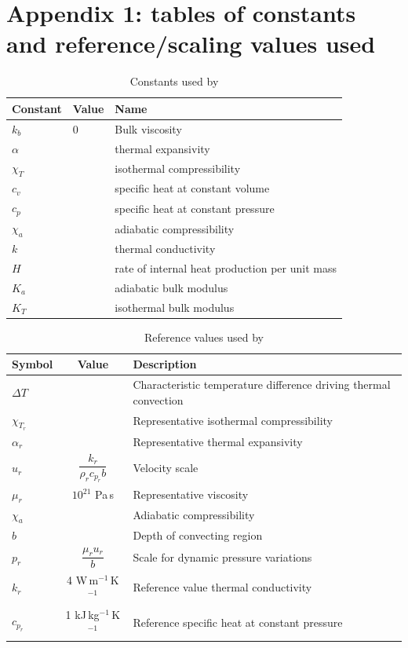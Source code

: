 \documentclass[document.tex]{subfiles}
\begin{document}
\section{Appendix 1: tables of constants and reference/scaling values used}
\begin{table}[ht] 
    \centering
    \caption{Constants used by \cite{scto01}}
    \label{schubert constants}
    \begin{tabular}{lll}
        \toprule
        Constant & Value & Name \\
        \midrule
        $k_b$  & 0 & Bulk viscosity \\
        $\alpha$  &  & thermal expansivity \\
        $\chi_T$  &  & isothermal compressibility \\
        $c_v$  &  & specific heat at constant volume \\
        $c_p$  &  & specific heat at constant pressure \\
        $\chi_a$ & & adiabatic compressibility \\
        $k$  &  & thermal conductivity \\
        $H$  &   & rate of internal heat production per unit mass \\
        $K_a$ &  & adiabatic bulk modulus \\
        $K_T$ & & isothermal bulk modulus\\
        \bottomrule
    \end{tabular}
\end{table}

\begin{table}[ht]
    \centering
    \caption{Reference values used by \cite{scto01}}
    \label{schubert ref}
    \renewcommand{\arraystretch}{1.8}   %
    \setlength{\tabcolsep}{12pt}        %
    \begin{tabular}{lcl}
        \toprule
        Symbol & Value & Description \\
        \midrule
        $\Delta T$ & & Characteristic temperature difference driving thermal convection \\
        $\chi_{T_r}$ & & Representative isothermal compressibility \\
        $\alpha_r$ & & Representative thermal expansivity \\
        $u_r$ & $\dfrac{k_r}{\rho_r c_{p_r} b}$ & Velocity scale \\
        $\mu_r$ & $10^{21}$ Pa\,s & Representative viscosity \\
        $\chi_a$ & & Adiabatic compressibility \\
        $b$ & & Depth of convecting region \\
        $p_r$ & $\dfrac{\mu_r u_r}{b}$ & Scale for dynamic pressure variations \\
        $k_r$ & 4 W\,m$^{-1}$\,K$^{-1}$ & Reference value thermal conductivity \\
        $c_{p_r}$ & 1 kJ\,kg$^{-1}$\,K$^{-1}$ & Reference specific heat at constant pressure \\
        \bottomrule
    \end{tabular}
\end{table}
\end{document}
